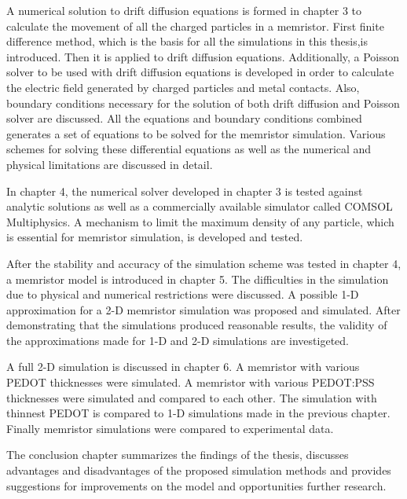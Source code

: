 \begin{doublespace}
A numerical solution to drift diffusion equations is formed in chapter 3 to calculate the movement of all the charged particles in a memristor. First finite difference method, which is the basis for all the simulations in this thesis,is introduced. Then it is applied to drift diffusion equations. Additionally, a Poisson solver to be used with drift diffusion equations is developed in order to calculate the electric field generated by charged particles and metal contacts. Also, boundary conditions necessary for the solution of both drift diffusion and Poisson solver are discussed. All the equations and boundary conditions combined generates a set of equations to be solved for the memristor simulation. Various schemes for solving these differential equations as well as the numerical and physical limitations are discussed in detail.
 
In chapter 4, the numerical solver developed in chapter 3 is tested against analytic solutions as well as a commercially available simulator called COMSOL Multiphysics. A mechanism to limit the maximum density of any particle, which is essential for memristor simulation, is developed and tested. 

After the stability and accuracy of the simulation scheme was tested in chapter 4, a memristor model is introduced in chapter 5. The difficulties in the simulation due to physical and numerical restrictions were discussed. A possible 1-D approximation for a 2-D memristor simulation was proposed and simulated. After demonstrating that the simulations produced reasonable results, the validity of the approximations made for 1-D and 2-D simulations are investigeted.  

A full 2-D simulation is discussed in chapter 6. A memristor with various PEDOT thicknesses were simulated. A memristor with various PEDOT:PSS thicknesses were simulated and compared to each other. The simulation with thinnest PEDOT is compared to 1-D simulations made in the previous chapter. Finally memristor simulations were compared to experimental data.

The conclusion chapter summarizes the findings of the thesis, discusses advantages and disadvantages of the proposed simulation methods and provides suggestions for improvements on the model and opportunities further research.



\end{doublespace}
